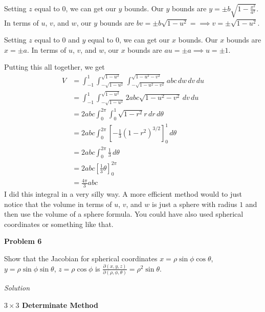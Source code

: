 \documentclass{article}
\newcommand{\lrb}[1]{\left[ #1 \right]}
\newcommand{\Solution}{\textit{Solution}}
\begin{document}
Setting $z$ equal to $0$, we can get our $y$ bounds. Our $y$ bounds are $y=\pm b\sqrt{1-\frac{x^2}{a^2}}$. In terms of $u$, $v$, and $w$, our $y$ bounds are $bv=\pm b\sqrt{1-u^2}=\implies v=\pm \sqrt{1-u^2}$.

Setting $z$ equal to $0$ and $y$ equal to $0$, we can get our $x$ bounds. Our $x$ bounds are $x=\pm a$. In terms of $u$, $v$, and $w$, our $x$ bounds are $au=\pm a\implies u =\pm 1$.

Putting this all together, we get
\begin{align*}
    V&=\int_{-1}^1\int_{-\sqrt{1-u^2}}^{\sqrt{1-u^2}}\int_{-\sqrt{1-u^2-v^2}}^{\sqrt{1-u^2-v^2}}abc\,dw\,dv\,du\\
    &=\int_{-1}^1\int_{-\sqrt{1-u^2}}^{\sqrt{1-u^2}} 2abc\sqrt{1-u^2-v^2}\,dv\,du\\
    &=2abc\int_{0}^{2\pi}\int_{0}^1 \sqrt{1-r^2}r\,dr\,d\theta\\
    &=2abc \int_0^{2\pi}\lrb{-\frac{1}{3}(1-r^2)^{3/2}}_0^1\,d\theta\tag{convert to polar because easier}\\
    &=2abc\int_0^{2\pi} \frac{1}{3}\,d\theta\\
    &=2abc\lrb{\frac{1}{3}\theta}_0^{2\pi}\\
    &=\boxed{\frac{4\pi}{3}abc}
\end{align*}
I did this integral in a very silly way. A more efficient method would to just notice that the volume in terms of $u$, $v$, and $w$ is just a sphere with radius $1$ and then use the volume of a sphere formula. You could have also used spherical coordinates or something like that.

{}\textbf{Problem 6}

Show that the Jacobian for spherical coordinates $x=\rho\sin\phi\cos\theta$, $y=\rho\sin\phi\sin\theta$, $z=\rho \cos\phi$ is $\displaystyle \frac{\partial (x,y,z)}{\partial (\rho,\phi,\theta)}=\rho^2\sin\theta$.

\Solution

{}\textbf{$3\times3$ Determinate Method}
\end{document}
